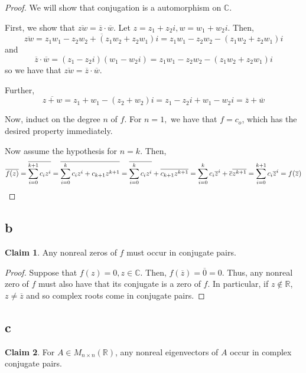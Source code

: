 \documentclass[12pt,letterpaper]{article}
\theoremstyle{definition}
\newtheorem*{claim}{Claim}
\newcommand{\R}{\mathbb{R}}
\newcommand{\C}{\mathbb{C}}
\begin{document}
\begin{proof}
  We will show that conjugation is a automorphism on $\C$.

  First, we show that $\overline{zw} = \overline{z} \cdot \overline{w}$. Let $z
  = z_1 + z_2i, w = w_1 + w_2i$. Then,
  \[
    \overline{zw} = \overline{z_1w_1 - z_2w_2 + (z_1w_2 + z_2w_1)i} = z_1w_1 - z_2w_2 - (z_1w_2 + z_2w_1)i
  \]
  and
  \[
    \overline{z} \cdot \overline{w} = (z_1 - z_2i)(w_1 - w_2i) = z_1w_1 - z_2w_2
    - (z_1w_2 + z_2w_1)i
  \]
  so we have that $\overline{zw} = \overline{z} \cdot \overline{w}$.

  Further,
  \[
    \overline{z + w} = z_1 + w_1 - (z_2 + w_2)i = z_1 - z_2i + w_1 - w_2i =
    \overline{z} + \overline{w}
  \]

  Now, induct on the degree $n$ of $f$. For $n = 1,$ we have that $f = c_o$,
  which has the desired property immediately.

  Now assume the hypothesis for $n = k$. Then,
  \[
    \overline{f(z)} = \overline{\sum_{i=0}^{k+1}c_iz^i} = \overline{\sum_{i=0}^kc_iz^i +
    c_{k+1}z^{k+1}} = \overline{\sum_{i=0}^kc_iz^i} + \overline{c_{k+1}z^{k+1}}
  = \sum_{i=0}^kc_i\overline{z}^i + \overline{c}\overline{z^{k+1}} \\
  = \sum_{i=0}^{k+1}c_i\overline{z}^i = f(\overline{z})
  \]
\end{proof}

\subsection*{b}

\begin{claim}
  Any nonreal zeros of $f$ must occur in conjugate pairs.
\end{claim}

\begin{proof}
  Suppose that $f(z) = 0, z \in \C$. Then, $f(\overline{z}) = \overline{0} =
  0$. Thus, any nonreal zero of $f$ must also have that its conjugate is a zero
  of $f$. In particular, if $z \notin \R$, $z \neq \overline{z}$ and so complex roots
  come in conjugate pairs.
\end{proof}

\subsection*{c}

\begin{claim}
  For $A \in M_{n \times n}(\R)$, any nonreal eigenvectors of $A$ occur in
  complex conjugate pairs.
\end{claim}
\end{document}
